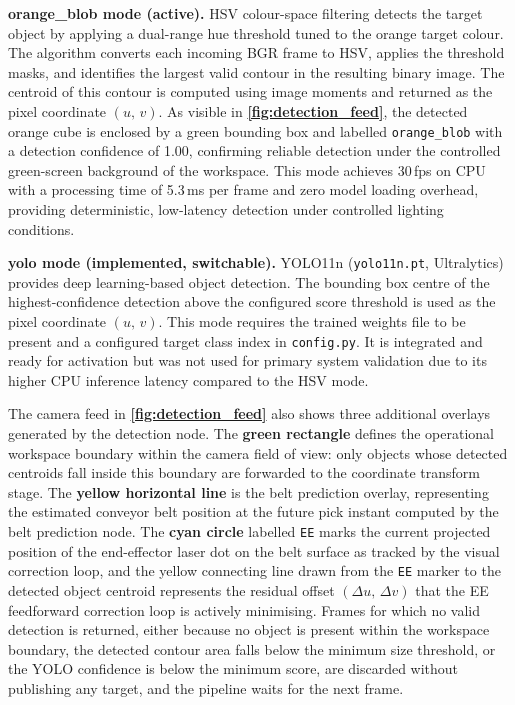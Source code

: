 \par
\hspace{1.27cm}
\textbf{orange\_blob mode (active).} HSV colour-space
filtering detects the target object by applying a
dual-range hue threshold tuned to the orange target
colour. The algorithm converts each incoming BGR frame
to HSV, applies the threshold masks, and identifies the
largest valid contour in the resulting binary image. The
centroid of this contour is computed using image moments
and returned as the pixel coordinate $(u,\, v)$. As
visible in \textbf{\autoref{fig:detection_feed}}, the
detected orange cube is enclosed by a green bounding box
and labelled \texttt{orange\_blob} with a detection
confidence of 1.00, confirming reliable detection under
the controlled green-screen background of the workspace.
This mode achieves 30\,fps on CPU with a processing time
of 5.3\,ms per frame and zero model loading overhead,
providing deterministic, low-latency detection under
controlled lighting conditions.

\par
\hspace{1.27cm}
\textbf{yolo mode (implemented, switchable).}
YOLO11n (\texttt{yolo11n.pt}, Ultralytics) provides
deep learning-based object detection. The bounding box
centre of the highest-confidence detection above the
configured score threshold is used as the pixel
coordinate $(u,\, v)$. This mode requires the trained
weights file to be present and a configured target class
index in \texttt{config.py}. It is integrated and ready
for activation but was not used for primary system
validation due to its higher CPU inference latency
compared to the HSV mode.

\par
\hspace{1.27cm}
The camera feed in \textbf{\autoref{fig:detection_feed}}
also shows three additional overlays generated by the
detection node. The \textbf{green rectangle} defines the
operational workspace boundary within the camera field of
view: only objects whose detected centroids fall inside
this boundary are forwarded to the coordinate transform
stage. The \textbf{yellow horizontal line} is the belt
prediction overlay, representing the estimated conveyor
belt position at the future pick instant computed by the
belt prediction node. The \textbf{cyan circle} labelled
\texttt{EE} marks the current projected position of the
end-effector laser dot on the belt surface as tracked by
the visual correction loop, and the yellow connecting line
drawn from the \texttt{EE} marker to the detected object
centroid represents the residual offset $(\Delta u,\,
\Delta v)$ that the EE feedforward correction loop is
actively minimising. Frames for which no valid detection
is returned, either because no object is present within
the workspace boundary, the detected contour area falls
below the minimum size threshold, or the YOLO confidence
is below the minimum score, are discarded without
publishing any target, and the pipeline waits for the
next frame.



